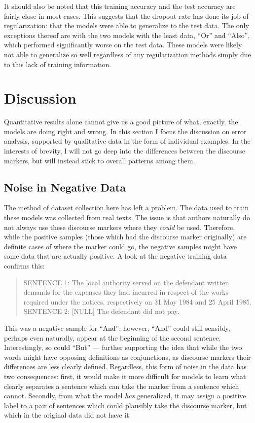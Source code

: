 It should also be noted that this training accuracy and the test accuracy are fairly close in most cases. This suggests that the dropout rate has done its job of regularization: that the models were able to generalize to the test data. The only exceptions thereof are with the two models with the least data, ``Or'' and ``Also'', which performed significantly worse on the test data. These models were likely not able to generalize so well regardless of any regularization methods simply due to this lack of training information.

\section{Discussion}

Quantitative results alone cannot give us a good picture of what, exactly, the models are doing right and wrong. In this section I focus the discussion on error analysis, supported by qualitative data in the form of individual examples. In the interests of brevity, I will not go deep into the differences between the discourse markers, but will instead stick to overall patterns among them. 

\subsection{Noise in Negative Data}

The method of dataset collection here has left a problem. The data used to train these models was collected from real texts. The issue is that authors naturally do not always use these discourse markers where they \textit{could} be used. Therefore, while the positive samples (those which had the discourse marker originally) are definite cases of where the marker could go, the negative samples might have some data that are actually positive. A look at the negative training data confirms this:

\begin{quote}
\small{SENTENCE 1:} \quad The local authority served on the defendant written demands for the expenses they had incurred in respect of the works required under the notices, respectively on 31 May 1984 and 25 April 1985. \linebreak
\small{SENTENCE 2:} \quad \small{[NULL]} The defendant did not pay. 
\end{quote}

This was a negative sample for ``And''; however, ``And'' could still sensibly, perhaps even naturally, appear at the beginning of the second sentence. Interestingly, so could ``But'' --- further supporting the idea that while the two words might have opposing definitions as conjunctions, as discourse markers their differences are less clearly defined. Regardless, this form of noise in the data has two consequences: first, it would make it more difficult for models to learn what clearly separates a sentence which can take the marker from a sentence which cannot. Secondly, from what the model \textit{has} generalized, it may assign a positive label to a pair of sentences which could plausibly take the discourse marker, but which in the original data did not have it. 

